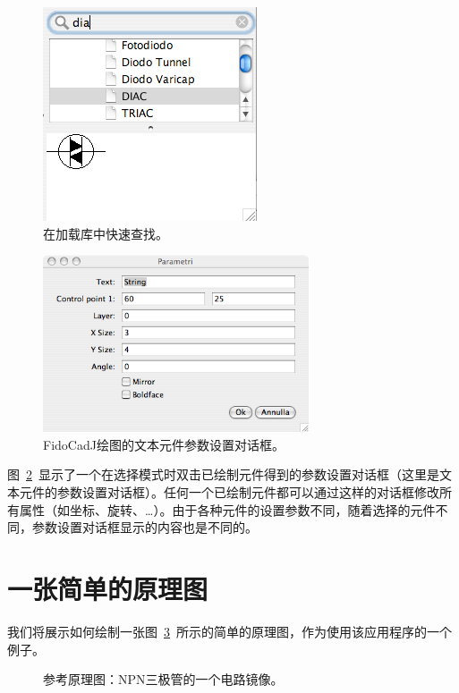 \documentclass[10pt,a4paper,twoside]{scrreprt}
\begin{document}
\begin{figure}
\centering
\includegraphics[width=.4\textwidth]{ricerca}
\caption{在加载库中快速查找。}
\label{fig_ricerca}
\end{figure}
\begin{figure}
\centering \includegraphics[width=0.7\textwidth,]{param_testo} 
\caption{FidoCadJ绘图的文本元件参数设置对话框。}
\label{fig_param_testo} 
\end{figure}

图~\ref{fig_param_testo}~显示了一个在选择模式时双击已绘制元件得到的参数设置对话框（这里是文本元件的参数设置对话框）。任何一个已绘制元件都可以通过这样的对话框修改所有属性（如坐标、旋转、\dots）。由于各种元件的设置参数不同，随着选择的元件不同，参数设置对话框显示的内容也是不同的。

\section{一张简单的原理图}

我们将展示如何绘制一张图~\ref{fig_schema}~所示的简单的原理图，作为使用该应用程序的一个例子。

\begin{figure}
\centering %
 
\caption{参考原理图：NPN三极管的一个电路镜像。}
\label{fig_schema} 
\end{figure}
\end{document}
